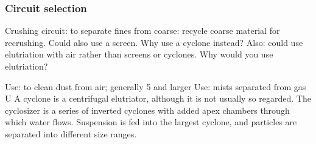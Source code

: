 \begin{frame}\frametitle{Circuit selection}
	Crushing circuit: to separate fines from coarse: recycle coarse material for recrushing. Could also use a screen. Why use a cyclone instead?
	Also: could use elutriation with air rather than screens or cyclones. Why would you use elutriation?

	Use: to clean dust from air; generally 5 \micron and larger
	Use: mists separated from gas
	U
	A cyclone is a centrifugal elutriator, although it is not usually so regarded. The cyclosizer is a series of inverted cyclones with added apex chambers through which water flows. Suspension is fed into the largest cyclone, and particles are separated into different size ranges.	
\end{frame}
